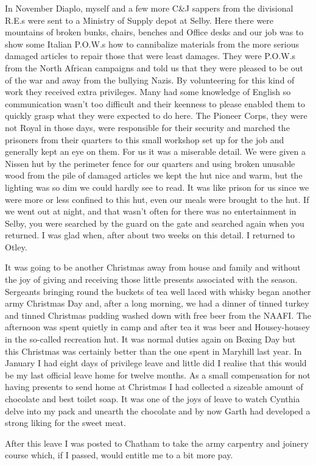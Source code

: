 In November \lcorporal Diaplo, myself and a few more C\&J sappers from the
divisional R.E.s were sent to a Ministry of Supply depot at
Selby. Here there were mountains of broken bunks, chairs, benches
and Office desks and our job was to show some Italian P.O.W.s how to
cannibalize materials from the more serious damaged articles to repair
those that were least damages. They were P.O.W.s from the North
African campaigns and told us that they were pleased to be out of the
war and away from the bullying Nazis. By volunteering for this kind of
work they received extra privileges. Many had some knowledge of
English so communication wasn't too difficult and their keenness to
please enabled them to quickly grasp what they were expected to do
here. The Pioneer Corps, they were not Royal in those days, were
responsible for their security and marched the prisoners from their
quarters to this small workshop set up for the job and generally kept
an eye on them. For us it was a miserable detail. We were given a
Nissen hut by the perimeter fence for our quarters and using broken
unusable wood from the pile of damaged articles we kept the hut nice
and warm, but the lighting was so dim we could hardly see to read. It
was like prison for us since we were more or less confined to this
hut, even our meals were brought to the hut. If we went out at night,
and that wasn't often for there was no entertainment in Selby, you
were searched by the guard on the gate and searched again when you
returned. I was glad when, after about two weeks on this detail. I
returned to Otley.

It was going to be another Christmas away from house and family and
without the joy of giving and receiving those little presents
associated with the season. Sergeants bringing round the buckets of
tea well laced with whisky began another army Christmas Day and, after
a long morning, we had a dinner of tinned turkey and tinned Christmas
pudding washed down with free beer from the NAAFI. The afternoon was
spent quietly in camp and after tea it was beer and Housey-housey in
the so-called recreation hut. It was normal duties again on Boxing Day
but this Christmas was certainly better than the one spent in
Maryhill last year. In January I had eight days of privilege leave and
little did I realise that this would be my last official leave home for
twelve months. As a small compensation for not having presents to send
home at Christmas I had collected a sizeable amount of chocolate and
best toilet soap. It was one of the joys of leave to watch Cynthia
delve into my pack and unearth the chocolate and by now Garth had
developed a strong liking for the sweet meat.

After this leave I was posted to Chatham to take the army carpentry
and joinery course which, if I passed, would entitle me to a bit more
pay.
